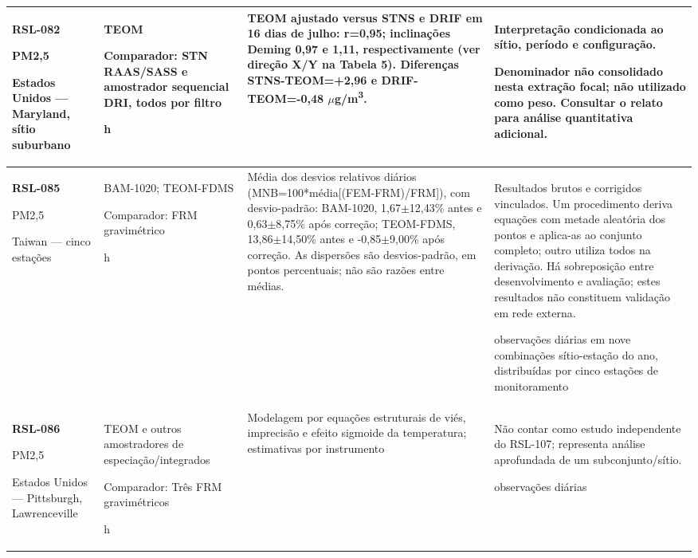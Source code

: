 \begin{longtable}{|P{0.18\textwidth}|P{0.25\textwidth}|P{0.28\textwidth}|P{\arrayrulewidth\relax}|}
\textbf{RSL-082}\par\textcite{rsl082}\par PM2,5\par Estados Unidos --- Maryland, sítio suburbano & TEOM\par\medskip Comparador: STN RAAS/SASS e amostrador sequencial DRI, todos por filtro\par{} h & TEOM ajustado versus STNS e DRIF em 16 dias de julho: r=0,95; inclinações Deming 0,97 e 1,11, respectivamente (ver direção X/Y na Tabela 5). Diferenças STNS-TEOM=+2,96 e DRIF-TEOM=-0,48 \ensuremath{\mu}g/m\textsuperscript{3}. & Interpretação condicionada ao sítio, período e configuração.\par\medskip Denominador não consolidado nesta extração focal; não utilizado como peso. Consultar o relato para análise quantitativa adicional.\\\hline
\textbf{RSL-085}\par\textcite{rsl085}\par PM2,5\par Taiwan --- cinco estações & BAM-1020; TEOM-FDMS\par\medskip Comparador: FRM gravimétrico\par{} h & Média dos desvios relativos diários (MNB=100*média[(FEM-FRM)/FRM]), com desvio-padrão: BAM-1020, 1,67\ensuremath{\pm}12,43\% antes e 0,63\ensuremath{\pm}8,75\% após correção; TEOM-FDMS, 13,86\ensuremath{\pm}14,50\% antes e -0,85\ensuremath{\pm}9,00\% após correção. As dispersões são desvios-padrão, em pontos percentuais; não são razões entre médias. & Resultados brutos e corrigidos vinculados. Um procedimento deriva equações com metade aleatória dos pontos e aplica-as ao conjunto completo; outro utiliza todos na derivação. Há sobreposição entre desenvolvimento e avaliação; estes resultados não constituem validação em rede externa.\par{} observações diárias em nove combinações sítio-estação do ano, distribuídas por cinco estações de monitoramento\\\hline
\textbf{RSL-086}\par\textcite{rsl086}\par PM2,5\par Estados Unidos --- Pittsburgh, Lawrenceville & TEOM e outros amostradores de especiação/integrados\par\medskip Comparador: Três FRM gravimétricos\par{} h & Modelagem por equações estruturais de viés, imprecisão e efeito sigmoide da temperatura; estimativas por instrumento & Não contar como estudo independente do RSL-107; representa análise aprofundada de um subconjunto/sítio.\par{} observações diárias\\\hline

\end{longtable}

